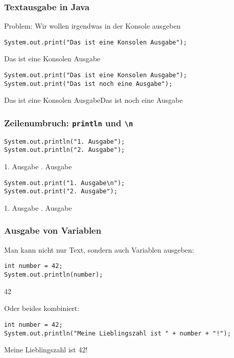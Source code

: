 \documentclass{../../presentation}
\begin{document}
\begin{frame}[fragile]
  \frametitle{Textausgabe in Java}
  \pause
  Problem: Wir wollen irgendwas in der Konsole ausgeben
  \pause
  \vspace{0.5em}
  \begin{verbatim}
System.out.print("Das ist eine Konsolen Ausgabe");
  \end{verbatim}
  \begin{ausgabe}
    Das ist eine Konsolen Ausgabe
  \end{ausgabe}
  \pause
  \begin{verbatim}
System.out.print("Das ist eine Konsolen Ausgabe");
System.out.print("Das ist noch eine Ausgabe");
  \end{verbatim}
  \pause
  \begin{ausgabe}
    Das ist eine Konsolen AusgabeDas ist noch eine Ausgabe
  \end{ausgabe}
\end{frame}

\begin{frame}[fragile]
  \frametitle{Zeilenumbruch: \texttt{println} und \texttt{\textbackslash n}}
  \pause
  \begin{verbatim}
System.out.println("1. Ausgabe");
System.out.println("2. Ausgabe");
  \end{verbatim}
  \pause
  \begin{ausgabe}
    1. Ausgabe . Ausgabe
  \end{ausgabe}
  \pause
  \begin{verbatim}
System.out.print("1. Ausgabe\n");
System.out.print("2. Ausgabe");
  \end{verbatim}
  \pause
  \begin{ausgabe}
    1. Ausgabe . Ausgabe
  \end{ausgabe}
\end{frame}

\begin{frame}[fragile]
  \frametitle{Ausgabe von Variablen}
  \pause
  Man kann nicht nur Text, sondern auch Variablen ausgeben:
  \pause
  \begin{verbatim}
int number = 42;
System.out.println(number);
  \end{verbatim}
  \begin{ausgabe}
    42
  \end{ausgabe}
  \pause
  Oder beides kombiniert:
  \begin{verbatim}
int number = 42;
System.out.println("Meine Lieblingszahl ist " + number + "!");
  \end{verbatim}
  \pause
  \begin{ausgabe}
    Meine Lieblingszahl ist 42!
  \end{ausgabe}
\end{frame}
\end{document}
